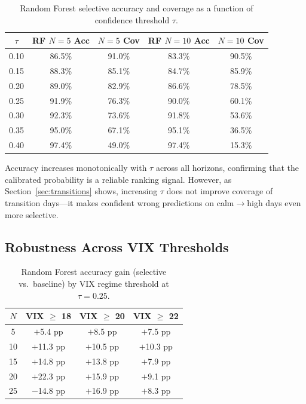 \documentclass[12pt]{article}
\begin{document}
\begin{table}[H]
\centering
\caption{Random Forest selective accuracy and coverage as a function of confidence threshold
$\tau$.}
\label{tab:threshold}
\begin{tabular}{ccccc}
\toprule
$\tau$ & RF $N{=}5$ Acc & $N{=}5$ Cov & RF $N{=}10$ Acc & $N{=}10$ Cov \\
\midrule
0.10 & 86.5\% & 91.0\% & 83.3\% & 90.5\% \\
0.15 & 88.3\% & 85.1\% & 84.7\% & 85.9\% \\
0.20 & 89.0\% & 82.9\% & 86.6\% & 78.5\% \\
0.25 & 91.9\% & 76.3\% & 90.0\% & 60.1\% \\
0.30 & 92.3\% & 73.6\% & 91.8\% & 53.6\% \\
0.35 & 95.0\% & 67.1\% & 95.1\% & 36.5\% \\
0.40 & 97.4\% & 49.0\% & 97.4\% & 15.3\% \\
\bottomrule
\end{tabular}
\end{table}

Accuracy increases monotonically with $\tau$ across all horizons, confirming that the calibrated
probability is a reliable ranking signal. However, as Section~\ref{sec:transitions} shows,
increasing $\tau$ does not improve coverage of transition days---it makes confident wrong
predictions on calm$\to$high days even more selective.

\subsection{Robustness Across VIX Thresholds}

\begin{table}[H]
\centering
\caption{Random Forest accuracy gain (selective vs.\ baseline) by VIX regime threshold at
$\tau = 0.25$.}
\label{tab:robust}
\begin{tabular}{cccc}
\toprule
$N$ & VIX $\geq$ 18 & VIX $\geq$ 20 & VIX $\geq$ 22 \\
\midrule
5  & $+$5.4 pp  & $+$8.5 pp  & $+$7.5 pp  \\
10 & $+$11.3 pp & $+$10.5 pp & $+$10.3 pp \\
15 & $+$14.8 pp & $+$13.8 pp & $+$7.9 pp  \\
20 & $+$22.3 pp & $+$15.9 pp & $+$9.1 pp  \\
25 & $-$14.8 pp & $+$16.9 pp & $+$8.3 pp  \\
\bottomrule
\end{tabular}
\end{table}
\end{document}
